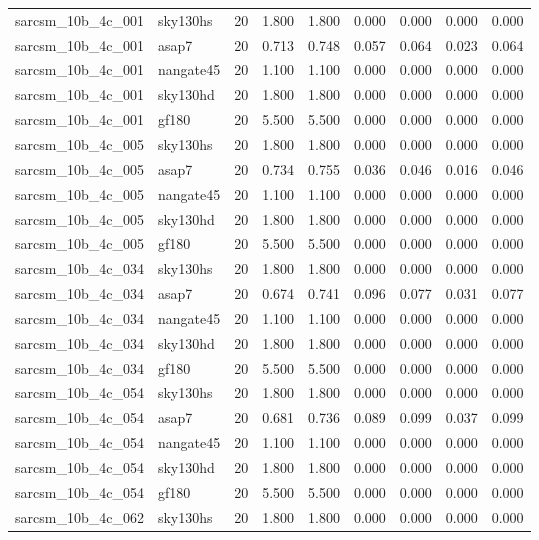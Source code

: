 \begin{tabular}{llrrrrrrr}
sarcsm\_10b\_4c\_001 & sky130hs & 20 & 1.800 & 1.800 & 0.000 & 0.000 & 0.000 & 0.000 \\
sarcsm\_10b\_4c\_001 & asap7 & 20 & 0.713 & 0.748 & 0.057 & 0.064 & 0.023 & 0.064 \\
sarcsm\_10b\_4c\_001 & nangate45 & 20 & 1.100 & 1.100 & 0.000 & 0.000 & 0.000 & 0.000 \\
sarcsm\_10b\_4c\_001 & sky130hd & 20 & 1.800 & 1.800 & 0.000 & 0.000 & 0.000 & 0.000 \\
sarcsm\_10b\_4c\_001 & gf180 & 20 & 5.500 & 5.500 & 0.000 & 0.000 & 0.000 & 0.000 \\
sarcsm\_10b\_4c\_005 & sky130hs & 20 & 1.800 & 1.800 & 0.000 & 0.000 & 0.000 & 0.000 \\
sarcsm\_10b\_4c\_005 & asap7 & 20 & 0.734 & 0.755 & 0.036 & 0.046 & 0.016 & 0.046 \\
sarcsm\_10b\_4c\_005 & nangate45 & 20 & 1.100 & 1.100 & 0.000 & 0.000 & 0.000 & 0.000 \\
sarcsm\_10b\_4c\_005 & sky130hd & 20 & 1.800 & 1.800 & 0.000 & 0.000 & 0.000 & 0.000 \\
sarcsm\_10b\_4c\_005 & gf180 & 20 & 5.500 & 5.500 & 0.000 & 0.000 & 0.000 & 0.000 \\
sarcsm\_10b\_4c\_034 & sky130hs & 20 & 1.800 & 1.800 & 0.000 & 0.000 & 0.000 & 0.000 \\
sarcsm\_10b\_4c\_034 & asap7 & 20 & 0.674 & 0.741 & 0.096 & 0.077 & 0.031 & 0.077 \\
sarcsm\_10b\_4c\_034 & nangate45 & 20 & 1.100 & 1.100 & 0.000 & 0.000 & 0.000 & 0.000 \\
sarcsm\_10b\_4c\_034 & sky130hd & 20 & 1.800 & 1.800 & 0.000 & 0.000 & 0.000 & 0.000 \\
sarcsm\_10b\_4c\_034 & gf180 & 20 & 5.500 & 5.500 & 0.000 & 0.000 & 0.000 & 0.000 \\
sarcsm\_10b\_4c\_054 & sky130hs & 20 & 1.800 & 1.800 & 0.000 & 0.000 & 0.000 & 0.000 \\
sarcsm\_10b\_4c\_054 & asap7 & 20 & 0.681 & 0.736 & 0.089 & 0.099 & 0.037 & 0.099 \\
sarcsm\_10b\_4c\_054 & nangate45 & 20 & 1.100 & 1.100 & 0.000 & 0.000 & 0.000 & 0.000 \\
sarcsm\_10b\_4c\_054 & sky130hd & 20 & 1.800 & 1.800 & 0.000 & 0.000 & 0.000 & 0.000 \\
sarcsm\_10b\_4c\_054 & gf180 & 20 & 5.500 & 5.500 & 0.000 & 0.000 & 0.000 & 0.000 \\
sarcsm\_10b\_4c\_062 & sky130hs & 20 & 1.800 & 1.800 & 0.000 & 0.000 & 0.000 & 0.000 \\

\end{tabular}
